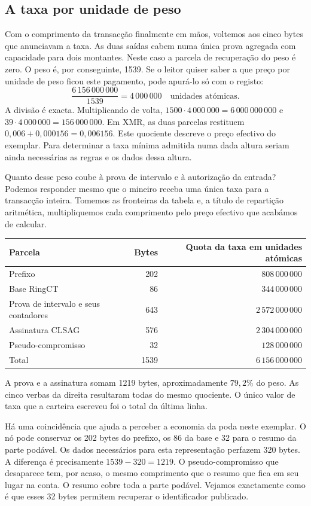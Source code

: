 \subsection{A taxa por unidade de peso}

Com o comprimento da transacção finalmente em mãos, voltemos aos
cinco bytes que anunciavam a taxa. As duas saídas cabem numa única
prova agregada com capacidade para dois montantes. Neste caso a
parcela de recuperação do peso é zero. O peso é, por conseguinte,
1539. Se o leitor quiser saber a que preço por unidade de peso
ficou este pagamento, pode apurá-lo só com o registo:
\[
           \frac{6\,156\,000\,000}{1539}
                =4\,000\,000\quad\text{unidades atómicas}.
\]
A divisão é exacta. Multiplicando de volta,
\(1500\cdot4\,000\,000=6\,000\,000\,000\) e
\(39\cdot4\,000\,000=156\,000\,000\). Em XMR, as duas parcelas
restituem \(0{,}006+0{,}000156=0{,}006156\). Este quociente
descreve o preço efectivo do exemplar. Para determinar a taxa
mínima admitida numa dada altura seriam ainda necessárias as
regras e os dados dessa altura.

Quanto desse peso coube à prova de intervalo e à autorização da
entrada? Podemos responder mesmo que o mineiro receba uma única
taxa para a transacção inteira. Tomemos as fronteiras da tabela e,
a título de repartição aritmética, multipliquemos cada comprimento
pelo preço efectivo que acabámos de calcular.
\begin{center}\small
\begin{tabular}{l r r}
Parcela & Bytes & Quota da taxa em unidades atómicas\\ \hline
Prefixo & 202 & \(808\,000\,000\)\\
Base RingCT & 86 & \(344\,000\,000\)\\
Prova de intervalo e seus contadores & 643 & \(2\,572\,000\,000\)\\
Assinatura CLSAG & 576 & \(2\,304\,000\,000\)\\
Pseudo-compromisso & 32 & \(128\,000\,000\)\\ \hline
Total & 1539 & \(6\,156\,000\,000\)
\end{tabular}
\end{center}
A prova e a assinatura somam 1219 bytes, aproximadamente \(79{,}2\%\)
do peso. As cinco verbas da direita resultaram todas do mesmo
quociente. O único valor de taxa que a carteira escreveu foi o
total da última linha.

Há uma coincidência que ajuda a perceber a economia da poda neste
exemplar. O nó pode conservar os 202 bytes do prefixo, os 86 da base
e 32 para o resumo da parte podável. Os dados necessários para esta
representação perfazem 320 bytes. A diferença é precisamente
\(1539-320=1219\). O pseudo-compromisso que desaparece tem, por acaso,
o mesmo comprimento que o resumo que fica em seu lugar na conta.
O resumo cobre toda a parte podável. Vejamos exactamente como é
que esses 32 bytes permitem recuperar o identificador publicado.

